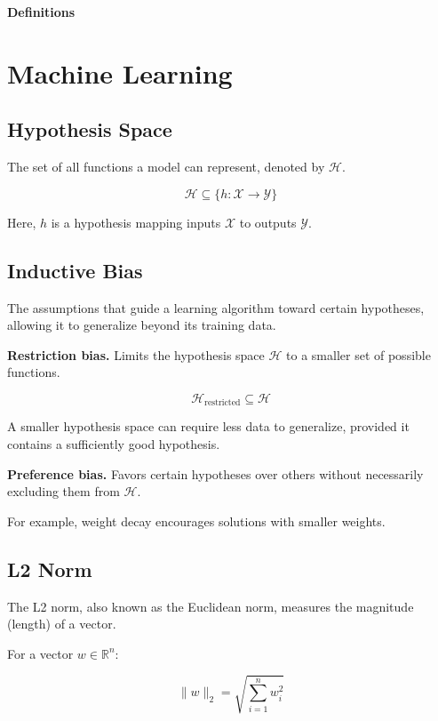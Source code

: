 \documentclass[12pt, letterpaper]{article}
\begin{document}
\vspace*{-1cm}
\begin{center}
    {\Huge\bfseries Definitions}
\end{center}

\section{Machine Learning}

\subsection{Hypothesis Space}

The set of all functions a model can represent, denoted by
$\mathcal{H}$.

\[
    \mathcal{H} \subseteq
    \{h : \mathcal{X} \to \mathcal{Y}\}
\]

Here, $h$ is a hypothesis mapping inputs $\mathcal{X}$
to outputs $\mathcal{Y}$.

\subsection{Inductive Bias}

The assumptions that guide a learning algorithm toward certain
hypotheses, allowing it to generalize beyond its training data.

\textbf{Restriction bias.}
Limits the hypothesis space $\mathcal{H}$ to a smaller set
of possible functions.

\[
    \mathcal{H}_{\text{restricted}} \subseteq \mathcal{H}
\]

A smaller hypothesis space can require less data to generalize,
provided it contains a sufficiently good hypothesis.

\textbf{Preference bias.}
Favors certain hypotheses over others without necessarily
excluding them from $\mathcal{H}$.

For example, weight decay encourages solutions with smaller weights.

\subsection{L2 Norm} %

The L2 norm, also known as the Euclidean norm, measures
the magnitude (length) of a vector.

For a vector $w \in \mathbb{R}^n$:

\[
    \|w\|_2 = \sqrt{\sum_{i=1}^{n} w_i^2}
\]
\end{document}
